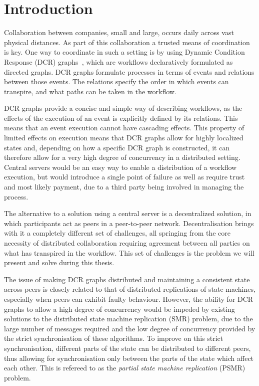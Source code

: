 \documentclass{article}
\begin{document}
\newpage

\section{Introduction}

	Collaboration between companies, small and large, occurs daily across vast physical distances.
	As part of this collaboration a trusted means of coordination is key.
	One way to coordinate in such a setting is by using Dynamic Condition Response (DCR) graphs~\cite{hildebrandt_declarative_2011}, which are workflows declaratively formulated as directed graphs.
	DCR graphs formulate processes in terms of events and relations between those events.
	The relations specify the order in which events can transpire, and what paths can be taken in the workflow.

	DCR graphs provide a concise and simple way of describing workflows, as the effects of the execution of an event is explicitly defined by its relations.
	This means that an event execution cannot have cascading effects.
	This property of limited effects on execution means that DCR graphs allow for highly localized states and, depending on how a specific DCR graph is constructed, it can therefore allow for a very high degree of concurrency in a distributed setting.
	Central servers would be an easy way to enable a distribution of a workflow execution, but would introduce a single point of failure as well as require trust and most likely payment, due to a third party being involved in managing the process.

	The alternative to a solution using a central server is a decentralized solution, in which participants act as peers in a peer-to-peer network.
	Decentralisation brings with it a completely different set of challenges, all springing from the core necessity of distributed collaboration requiring agreement between all parties on what has transpired in the workflow.
	This set of challenges is the problem we will present and solve during this thesis.

	The issue of making DCR graphs distributed and maintaining a consistent state across peers is closely related to that of distributed replications of state machines, especially when peers can exhibit faulty behaviour.
	However, the ability for DCR graphs to allow a high degree of concurrency would be impeded by existing solutions to the distributed state machine replication (SMR) problem, due to the large number of messages required and the low degree of concurrency provided by the strict synchronisation of these algorithms.
	To improve on this strict synchronisation, different parts of the state can be distributed to different peers, thus allowing for synchronisation only between the parts of the state which affect each other.
	This is refereed to as the \textit{partial state machine replication} (PSMR) problem.
\end{document}
